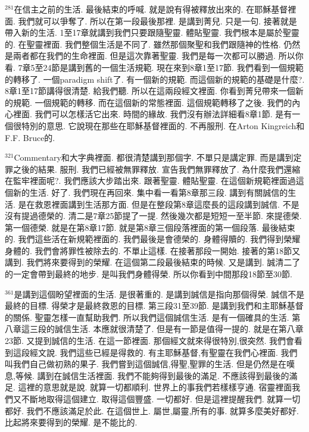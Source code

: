 \documentclass{book}
\begin{document}
$^{281}$在信主之前的生活.
最後結束的呼喊.
就是說有得被釋放出來的.
在耶穌基督裡面.
我們就可以爭奪了.
所以在第一段最後那裡.
是講到菁兒.
只是一句.
接著就是帶入新的生活.
1至17章就講到我們只要跟隨聖靈.
體貼聖靈.
我們根本是屬於聖靈的.
在聖靈裡面.
我們整個生活是不同了.
雖然那個聚聖和我們跟隨神的性格.
仍然是兩者都在我們的生命裡面.
但是這次靠著聖靈.
我們是每一次都可以勝過.
所以你看.
7章5至24節是講到舊的一個生活規範.
現在來到8章1至17節.
我們看到一個規範的轉移了.
一個paradigm shift了.
有一個新的規範.
而這個新的規範的基礎是什麼?.
8章1至17節講得很清楚.
給我們聽.
所以在這兩段經文裡面.
你看到菁兒帶來一個新的規範.
一個規範的轉移.
而在這個新的常態裡面.
這個規範轉移了之後.
我們的內心裡面.
我們可以怎樣活它出來.
時間的緣故.
我們沒有辦法詳細看8章1節.
是有一個很特別的意思.
它說現在那些在耶穌基督裡面的.
不再服刑.
在Arton Kingreich和F.F. Bruce的.

$^{321}$Commentary和大字典裡面.
都很清楚講到那個字.
不單只是講定罪.
而是講到定罪之後的結果.
服刑.
我們已經被無罪釋放.
宣告我們無罪釋放了.
為什麼我們還縮在監牢裡面呢?.
我們應該大步踏出來.
跟著聖靈.
體貼聖靈.
在這個新規範裡面過這個新的生活.
好了.
我們現在再回來.
集中看一看第8章那三段.
講到有關誠信的生活.
是在救恩裡面講到生活那方面.
但是在整段第8章這麼長的這段講到誠信.
不是沒有提過德榮的.
清二是7章25節提了一提.
然後幾次都是短短一至半節.
來提德榮.
第一個德榮.
就是在第8章17節.
就是第8章三個段落裡面的第一個段落.
最後結束的.
我們這些活在新規範裡面的.
我們最後是會德榮的.
身體得贖的.
我們得到榮耀身體的.
我們會將罪性被除去的.
不單止這樣.
在接著那段一開始.
接著的第18節又講到.
我們將來要得到的榮耀.
在這個第二段最後結束的時候.
又是講到.
誠清二了的一定會帶到最終的地步.
是叫我們身體得榮.
所以你看到中間那段18節至30節.

$^{361}$是講到這個盼望裡面的生活.
是很著重的.
是講到誠信是指向那個得榮.
誠信不是最終的目標.
得榮才是最終救恩的目標.
第三段31至39節.
是講到我們和主耶穌基督的關係.
聖靈怎樣一直幫助我們.
所以我們這個誠信生活.
是有一個確具的生活.
第八章這三段的誠信生活.
本應就很清楚了.
但是有一節是值得一提的.
就是在第八章23節.
又提到誠信的生活.
在這一節裡面.
那個經文就來得很特別,很突然.
我們會看到這段經文說.
我們這些已經是得救的.
有主耶穌基督,有聖靈在我們心裡面.
我們叫我們自己做初熟的果子.
我們嘗到這個誠信,得聖,聖罪的生活.
但是仍然是在嘆息,等候.
講到在誠信生活裡面.
我們不能夠得到最後的滿足.
不應該得到最後的滿足.
這裡的意思就是說.
就算一切都順利.
世界上的事我們若樣樣亨通.
宿靈裡面我們又不斷地取得這個建立.
取得這個豐盛.
一切都好.
但是這裡提醒我們.
就算一切都好.
我們不應該滿足於此.
在這個世上.
屬世,屬靈,所有的事.
就算多麼美好都好.
比起將來要得到的榮耀.
是不能比的.
\end{document}
